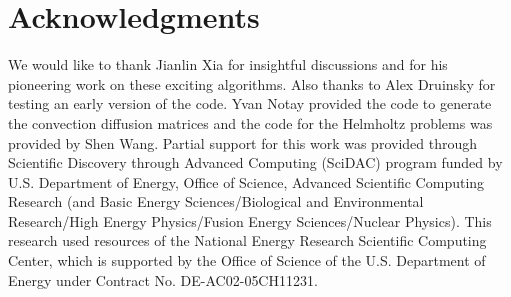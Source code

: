 \documentclass{article}
\begin{document}
\section*{Acknowledgments}
We would like to thank Jianlin Xia for insightful discussions and for
his pioneering work on these exciting algorithms. Also thanks to Alex
Druinsky for testing an early version of the code. Yvan Notay provided
the code to generate the convection diffusion matrices and the code
for the Helmholtz problems was provided by Shen Wang.
Partial support for this work was provided through Scientific
  Discovery through Advanced Computing (SciDAC) program funded by
  U.S. Department of Energy, Office of Science, Advanced Scientific
  Computing Research (and Basic Energy Sciences/Biological and
  Environmental Research/High Energy Physics/Fusion Energy
  Sciences/Nuclear Physics).
This research used resources of the National Energy Research
  Scientific Computing Center, which is supported by the Office of
  Science of the U.S. Department of Energy under Contract
  No. DE-AC02-05CH11231.




\end{document}
